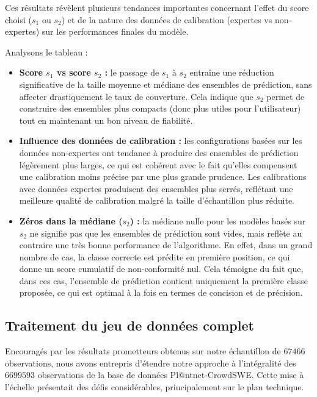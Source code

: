 \documentclass[a4paper,12pt]{article}
\begin{document}
Ces résultats révèlent plusieurs tendances importantes concernant l'effet du score choisi ($s_1$ ou $s_2$) et de la nature des données de calibration (expertes vs non-expertes) sur les performances finales du modèle.

Analysons le tableau : 

\begin{itemize}
    \item \textbf{Score $s_1$ vs score $s_2$ :} le passage de $s_1$ à $s_2$ entraîne une réduction significative de la taille moyenne et médiane des ensembles de prédiction, sans affecter drastiquement le taux de couverture. Cela indique que $s_2$ permet de construire des ensembles plus compacts (donc plus utiles pour l'utilisateur) tout en maintenant un bon niveau de fiabilité.
    \item \textbf{Influence des données de calibration :} les configurations basées sur les données non-expertes ont tendance à produire des ensembles de prédiction légèrement plus larges, ce qui est cohérent avec le fait qu’elles compensent une calibration moins précise par une plus grande prudence. Les calibrations avec données expertes produisent des ensembles plus serrés, reflétant une meilleure qualité de calibration malgré la taille d’échantillon plus réduite.
    \item \textbf{Zéros dans la médiane ($s_2$) :} la médiane nulle pour les modèles basés sur $s_2$ ne signifie pas que les ensembles de prédiction sont vides, mais reflète au contraire une très bonne performance de l'algorithme. En effet, dans un grand nombre de cas, la classe correcte est prédite en première position, ce qui donne un score cumulatif de non-conformité nul. Cela témoigne du fait que, dans ces cas, l'ensemble de prédiction contient uniquement la première classe proposée, ce qui est optimal à la fois en termes de concision et de précision.
\end{itemize}

\subsection{Traitement du jeu de données complet}

Encouragés par les résultats prometteurs obtenus sur notre échantillon de $\num{67 466}$ observations, nous avons entrepris d'étendre notre approche à l'intégralité des $\num{6 699 593}$ observations de la base de données Pl@ntnet-CrowdSWE. Cette mise à l'échelle présentait des défis considérables, principalement sur le plan technique.
\end{document}

